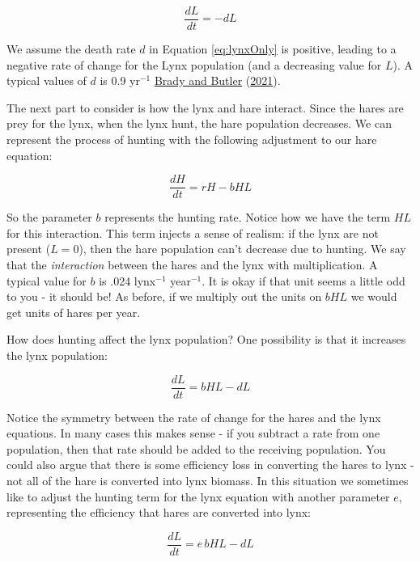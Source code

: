 \documentclass[
]{krantz}
\theoremstyle{definition}
\theoremstyle{definition}
\theoremstyle{definition}
\theoremstyle{definition}
\theoremstyle{remark}
\begin{document}
\begin{equation}
\frac{dL}{dt} = -dL \label{eq:lynxOnly}
\end{equation}

We assume the death rate \(d\) in Equation \eqref{eq:lynxOnly} is positive, leading to a negative rate of change for the Lynx population (and a decreasing value for \(L\)). A typical values of \(d\) is 0.9 yr\(^{-1}\) \protect\hyperlink{ref-brady_circle_2021}{Brady and Butler} (\protect\hyperlink{ref-brady_circle_2021}{2021}).

The next part to consider is how the lynx and hare interact. Since the hares are prey for the lynx, when the lynx hunt, the hare population decreases. We can represent the process of hunting with the following adjustment to our hare equation:

\begin{equation}
\frac{dH}{dt} = r H - b HL
\end{equation}

So the parameter \(b\) represents the hunting rate. Notice how we have the term \(HL\) for this interaction. This term injects a sense of realism: if the lynx are not present (\(L=0\)), then the hare population can't decrease due to hunting. We say that the \emph{interaction} between the hares and the lynx with multiplication. A typical value for \(b\) is .024 lynx\(^{-1}\) year\(^{-1}\). It is okay if that unit seems a little odd to you - it should be! As before, if we multiply out the units on \(bHL\) we would get units of hares per year.

How does hunting affect the lynx population? One possibility is that it increases the lynx population:

\begin{equation}
\frac{dL}{dt} =bHL -dL
\end{equation}

Notice the symmetry between the rate of change for the hares and the lynx equations. In many cases this makes sense - if you subtract a rate from one population, then that rate should be added to the receiving population. You could also argue that there is some efficiency loss in converting the hares to lynx - not all of the hare is converted into lynx biomass. In this situation we sometimes like to adjust the hunting term for the lynx equation with another parameter \(e\), representing the efficiency that hares are converted into lynx:

\begin{equation}
\frac{dL}{dt} =e \, bHL -dL
\end{equation}
\end{document}

